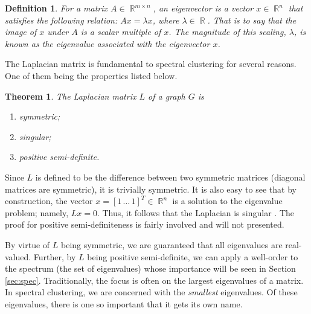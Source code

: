 \documentclass[11pt, letterpaper]{article}
\DeclareMathOperator{\R}{\mathbb{R}}
\theoremstyle{perchance}
\newtheorem*{definition}{Definition}
\newtheorem*{theorem}{Theorem}
\begin{document}
        \begin{definition}
            For a matrix $A \in \R^{m \times n}$, an \emph{eigenvector} is a vector $x \in \R^{n}$ that satisfies the following relation: $Ax = \lambda x$, where $\lambda \in \R$. That is to say that the image of $x$ under $A$ is a scalar multiple of $x$. The magnitude of this scaling, $\lambda$, is known as the \emph{eigenvalue} associated with the eigenvector $x$.
        \end{definition}
        
        \vspace{-3mm}
        
        The Laplacian matrix is fundamental to spectral clustering for several reasons. One of them being the properties listed below.
        
        \begin{theorem}
            The Laplacian matrix $L$ of a graph $G$ is
            \begin{enumerate}
                \item[(i)] symmetric;
                \item[(ii)] singular;
                \item[(iii)] positive semi-definite.
            \end{enumerate}
        \end{theorem}
    
        \vspace{-3mm}
    
        Since $L$ is defined to be the difference between two symmetric matrices (diagonal matrices are symmetric), it is trivially symmetric. It is also easy to see that by construction, the vector $x = [1 \, \ldots \, 1]^T \in \R^n$ is a solution to the eigenvalue problem; namely, $Lx = 0$. Thus, it follows that the Laplacian is singular \parencite[\S 22.1]{bennett}. The proof for positive semi-definiteness is fairly involved and will not presented.
    
        By virtue of $L$ being symmetric, we are guaranteed that all eigenvalues are real-valued. Further, by $L$ being positive semi-definite, we can apply a well-order to the spectrum (the set of eigenvalues) whose importance will be seen in Section \ref{sec:spec}. Traditionally, the focus is often on the largest eigenvalues of a matrix. In spectral clustering, we are concerned with the \emph{smallest} eigenvalues. Of these eigenvalues, there is one so important that it gets its own name.
\end{document}
